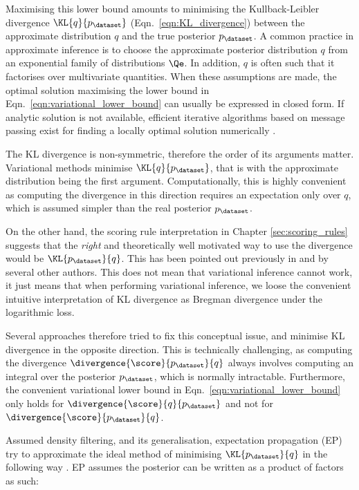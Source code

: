 Maximising this lower bound amounts to minimising the Kullback-Leibler divergence $\KL{q}{p_{\dataset}}$ (Eqn.\ \eqref{eqn:KL_divergence}) between the approximate distribution $q$ and the true posterior $p_{\dataset}$. A common practice in approximate inference is to choose the approximate posterior distribution $q$ from an exponential family of distributions $\Qe$. In addition, $q$ is often such that it factorises over multivariate quantities. When these assumptions are made, the optimal solution maximising the lower bound in Eqn.\ \eqref{eqn:variational_lower_bound} can usually be expressed in closed form. If analytic solution is not available, efficient iterative algorithms based on message passing exist for finding a locally optimal solution numerically \citep{Winn2006}.

The KL divergence is non-symmetric, therefore the order of its arguments matter. Variational methods minimise $\KL{q}{p_{\dataset}}$, that is with the approximate distribution being the first argument. Computationally, this is highly convenient as computing the divergence in this direction requires an expectation only over $q$, which is assumed simpler than the real posterior $p_{\dataset}$.

On the other hand, the scoring rule interpretation in Chapter \ref{sec:scoring_rules} suggests that the \emph{right} and theoretically well motivated way to use the divergence would be $\KL{p_{\dataset}}{q}$. This has been pointed out previously in \citep{Csato2002,Minka2001} and by several other authors. This does not mean that variational inference cannot work, it just means that when performing variational inference, we loose the convenient intuitive interpretation of KL divergence as Bregman divergence under the logarithmic loss.

Several approaches therefore tried to fix this conceptual issue, and minimise KL divergence in the opposite direction. This is technically challenging, as computing the divergence $\divergence{\score}{p_{\dataset}}{q}$ always involves computing an integral over the posterior $p_{\dataset}$, which is normally intractable. Furthermore, the convenient variational lower bound in Eqn.\ \ref{eqn:variational_lower_bound} only holds for $\divergence{\score}{q}{p_{\dataset}}$ and not for $\divergence{\score}{p_{\dataset}}{q}$.

Assumed density filtering, and its generalisation, expectation propagation (EP) try to approximate the ideal method of minimising $\KL{p_{\dataset}}{q}$ in the following way \citep{Minka2001thesis}. EP assumes the posterior can be written as a product of factors as such: 

